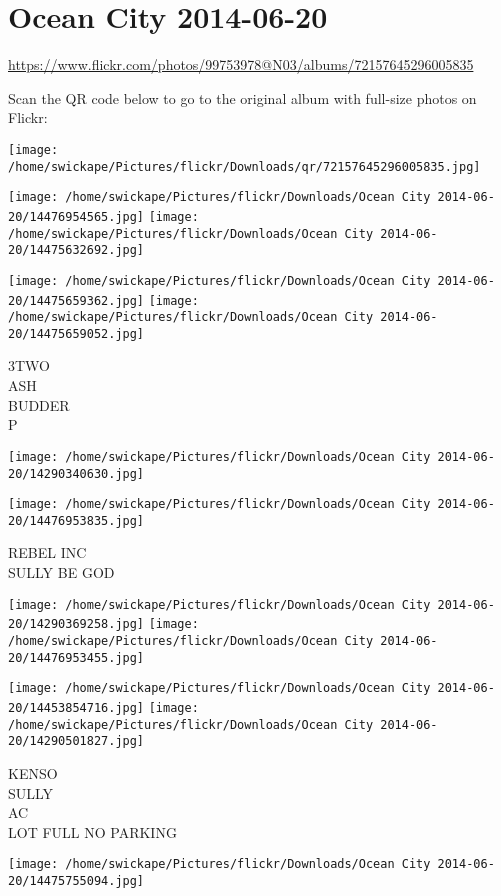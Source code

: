 \documentclass[10pt,letterpaper]{article}
\title{}
\author{}
\date{}
\begin{document}
\section*{Ocean City 2014-06-20}

\url{https://www.flickr.com/photos/99753978@N03/albums/72157645296005835}

Scan the QR code below to go to the original album with full-size photos on Flickr:

\texttt{[image: /home/swickape/Pictures/flickr/Downloads/qr/72157645296005835.jpg]}
\pagebreak

\texttt{[image: /home/swickape/Pictures/flickr/Downloads/Ocean City 2014-06-20/14476954565.jpg]}
\texttt{[image: /home/swickape/Pictures/flickr/Downloads/Ocean City 2014-06-20/14475632692.jpg]}

\texttt{[image: /home/swickape/Pictures/flickr/Downloads/Ocean City 2014-06-20/14475659362.jpg]}
\texttt{[image: /home/swickape/Pictures/flickr/Downloads/Ocean City 2014-06-20/14475659052.jpg]}

3TWO\\
ASH\\
BUDDER\\
P
\pagebreak

\texttt{[image: /home/swickape/Pictures/flickr/Downloads/Ocean City 2014-06-20/14290340630.jpg]}

\vspace{0.25in}
\texttt{[image: /home/swickape/Pictures/flickr/Downloads/Ocean City 2014-06-20/14476953835.jpg]}

REBEL INC\\
SULLY BE GOD
\pagebreak

\texttt{[image: /home/swickape/Pictures/flickr/Downloads/Ocean City 2014-06-20/14290369258.jpg]}
\texttt{[image: /home/swickape/Pictures/flickr/Downloads/Ocean City 2014-06-20/14476953455.jpg]}

\texttt{[image: /home/swickape/Pictures/flickr/Downloads/Ocean City 2014-06-20/14453854716.jpg]}
\texttt{[image: /home/swickape/Pictures/flickr/Downloads/Ocean City 2014-06-20/14290501827.jpg]}

KENSO\\
SULLY\\
AC\\
LOT FULL NO PARKING
\pagebreak

\texttt{[image: /home/swickape/Pictures/flickr/Downloads/Ocean City 2014-06-20/14475755094.jpg]}
\end{document}
